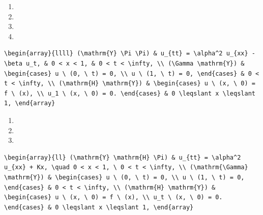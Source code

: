 \documentclass[
  ukrainian,
]{article}
\providecommand{\tightlist}{%
  \setlength{\itemsep}{0pt}\setlength{\parskip}{0pt}}
\begin{document}
\begin{enumerate}
\def\labelenumi{\arabic{enumi}.}
\setcounter{enumi}{12}
\tightlist
\item
\item
\item
\item
\end{enumerate}

\begin{verbatim}
\begin{array}{llll} (\mathrm{Y} \Pi \Pi) & u_{tt} = \alpha^2 u_{xx} - \beta u_t, & 0 < x < 1, & 0 < t < \infty, \\ (\Gamma \mathrm{Y}) & \begin{cases} u \ (0, \ t) = 0, \\ u \ (1, \ t) = 0, \end{cases} & 0 < t < \infty, \\ (\mathrm{H} \mathrm{Y}) & \begin{cases} u \ (x, \ 0) = f \ (x), \\ u_1 \ (x, \ 0) = 0. \end{cases} & 0 \leqslant x \leqslant 1, \end{array}
\end{verbatim}

\begin{enumerate}
\def\labelenumi{\arabic{enumi}.}
\setcounter{enumi}{16}
\tightlist
\item
\item
\item
\end{enumerate}

\begin{verbatim}
\begin{array}{ll} (\mathrm{Y} \mathrm{H} \Pi) & u_{tt} = \alpha^2 u_{xx} + Kx, \quad 0 < x < 1, \ 0 < t < \infty, \\ (\mathrm{\Gamma} \mathrm{Y}) & \begin{cases} u \ (0, \ t) = 0, \\ u \ (1, \ t) = 0, \end{cases} & 0 < t < \infty, \\ (\mathrm{H} \mathrm{Y}) & \begin{cases} u \ (x, \ 0) = f \ (x), \\ u_t \ (x, \ 0) = 0. \end{cases} & 0 \leqslant x \leqslant 1, \end{array}
\end{verbatim}
\end{document}
